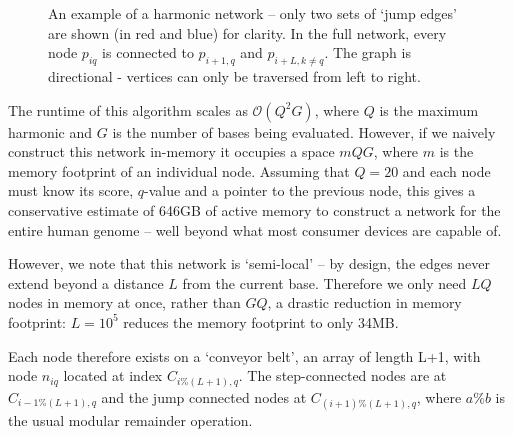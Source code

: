 \documentclass[fleqn,usenatbib]{mnras}
\begin{document}
\begin{figure}
\begin{center}
{
						}
						\caption{An example of a harmonic network -- only two sets of `jump edges' are shown (in red and blue) for clarity. In the full network, every node $p_{iq}$ is connected to $p_{i+1,q}$ and $p_{i+L,k\neq q}$. The graph is directional - vertices can only be traversed from left to right.}\label{F:Network}
					\end{center}
				\end{figure}

				The runtime of this algorithm scales as $\mathcal{O}(Q^2 G)$, where $Q$ is the maximum harmonic and $G$ is the number of bases being evaluated. However, if we naively construct this network in-memory it occupies a space $m Q G$, where $m$ is the memory footprint of an individual node. Assuming that $Q = 20$ and each node must know its score, $q$-value and a pointer to the previous node, this gives a conservative estimate of 646GB of active memory to construct a network for the entire human genome -- well beyond what most consumer devices are capable of. 

				However, we note that this network is `semi-local' -- by design, the edges never extend beyond a distance $L$ from the current base. Therefore we only need $LQ$ nodes in memory at once, rather than $GQ$, a drastic reduction in memory footprint: $L = 10^5$ reduces the memory footprint to only 34MB.

				Each node therefore exists on a `conveyor belt', an array of length L+1, with node $n_{iq}$ located at index $C_{i \% (L+1),q}$. The step-connected nodes are at $C_{i-1\% (L+1),q}$ and the jump connected nodes at $C_{(i+1) \% (L+1),q}$, where $a\%b$ is the usual modular remainder operation.
\end{document}

